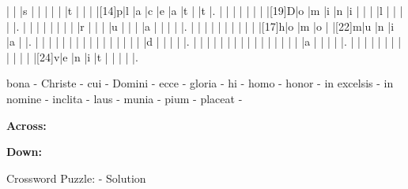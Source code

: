 \documentclass[12pt]{article}
\begin{document}
\begin{Puzzle}{22}{24}
  |{}  |{}  |s   |{}  |{}  |{}  |{}  |{}  |t   |{}  |{}  |{}  |[14]p|l   |a   |c   |e   |a   |t   |{}  |t   |.
  |{}  |{}  |{}  |{}  |{}  |{}  |{}  |[19]D|o   |m   |i   |n   |i   |{}  |{}  |{}  |l   |{}  |{}  |{}  |{}  |.
  |{}  |{}  |{}  |{}  |{}  |{}  |{}  |{}  |r   |{}  |{}  |{}  |u   |{}  |{}  |{}  |a   |{}  |{}  |{}  |{}  |.
  |{}  |{}  |{}  |{}  |{}  |{}  |{}  |{}  |{}  |{}  |[17]h|o   |m   |o   |{}  |[22]m|u   |n   |i   |a   |{}  |.
  |{}  |{}  |{}  |{}  |{}  |{}  |{}  |{}  |{}  |{}  |{}  |{}  |{}  |{}  |{}  |{}  |d   |{}  |{}  |{}  |{}  |.
  |{}  |{}  |{}  |{}  |{}  |{}  |{}  |{}  |{}  |{}  |{}  |{}  |{}  |{}  |{}  |{}  |a   |{}  |{}  |{}  |{}  |.
  |{}  |{}  |{}  |{}  |{}  |{}  |{}  |{}  |{}  |{}  |{}  |{}  |[24]v|e   |n   |i   |t   |{}  |{}  |{}  |{}  |.
\end{Puzzle}
\begin{rotate}{90}
\small \qquad
bona - Christe - cui - Domini - ecce - gloria - hi - homo - honor - in excelsis - in nomine - inclita - laus - munia - pium - placeat -
\end{rotate}
\hspace{-10pt}
\begin{PuzzleClues}{\textbf{Across:}}
\end{PuzzleClues}
\begin{PuzzleClues}{\textbf{Down:}}
\end{PuzzleClues}
\newpage
\begin{center}
  \huge{Crossword Puzzle: - Solution}
\end{center}
\vspace{1.5cm}
\PuzzleSolution
\end{document}
